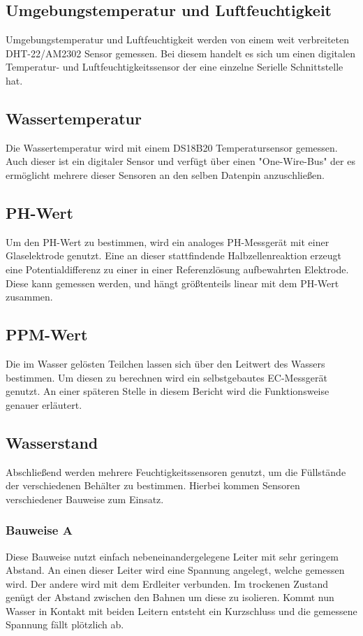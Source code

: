 \documentclass{report}
\begin{document}
\subsection{Umgebungstemperatur und Luftfeuchtigkeit}
Umgebungstemperatur und Luftfeuchtigkeit werden von einem weit verbreiteten DHT-22/AM2302 Sensor gemessen. Bei diesem handelt es sich um einen digitalen Temperatur- und Luftfeuchtigkeitssensor der eine einzelne Serielle Schnittstelle hat.
\subsection{Wassertemperatur}
Die Wassertemperatur wird mit einem DS18B20 Temperatursensor gemessen. Auch dieser ist ein digitaler Sensor und verfügt über einen "One-Wire-Bus" der es ermöglicht mehrere dieser Sensoren an den selben Datenpin anzuschließen.
\subsection{PH-Wert}
Um den PH-Wert zu bestimmen, wird ein analoges PH-Messgerät mit einer Glaselektrode genutzt. Eine an dieser stattfindende Halbzellenreaktion erzeugt eine Potentialdifferenz zu einer in einer Referenzlösung aufbewahrten Elektrode. Diese kann gemessen werden, und hängt größtenteils linear mit dem PH-Wert zusammen.
\subsection{PPM-Wert}
Die im Wasser gelösten Teilchen lassen sich über den Leitwert des Wassers bestimmen. Um diesen zu berechnen wird ein selbstgebautes EC-Messgerät genutzt. An einer späteren Stelle in diesem Bericht wird die Funktionsweise genauer erläutert.
\subsection{Wasserstand}
Abschließend werden mehrere Feuchtigkeitssensoren genutzt, um die Füllstände der verschiedenen Behälter zu bestimmen. Hierbei kommen Sensoren verschiedener Bauweise zum Einsatz. 
\subsubsection{Bauweise A}
Diese Bauweise nutzt einfach nebeneinandergelegene Leiter mit sehr geringem Abstand. An einen dieser Leiter wird eine Spannung angelegt, welche gemessen wird. Der andere wird mit dem Erdleiter verbunden. Im trockenen Zustand genügt der Abstand zwischen den Bahnen um diese zu isolieren. Kommt nun Wasser in Kontakt mit beiden Leitern entsteht ein Kurzschluss und die gemessene Spannung fällt plötzlich ab.
\end{document}
